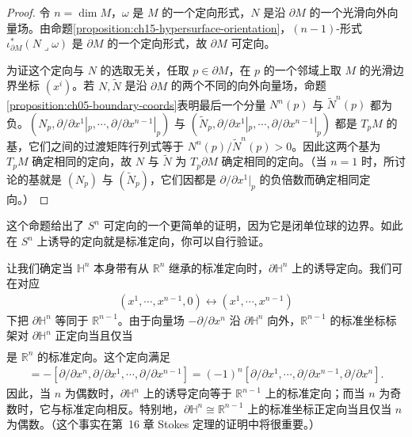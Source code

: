 \documentclass[../../main.tex]{subfiles}
\begin{document}
\begin{proof}
令 $n=\dim M$，$\omega$ 是 $M$ 的一个定向形式，$N$ 是沿 $\partial M$ 的一个光滑向外向量场。由命题\ref{proposition:ch15-hypersurface-orientation}，$(n-1)$-形式 $\iota_{\partial M}^*(N\lrcorner\omega)$ 是 $\partial M$ 的一个定向形式，故 $\partial M$ 可定向。

为证这个定向与 $N$ 的选取无关，任取 $p\in\partial M$，在 $p$ 的一个邻域上取 $M$ 的光滑边界坐标 $(x^i)$。若 $N,\widetilde N$ 是沿 $\partial M$ 的两个不同的向外向量场，命题\ref{proposition:ch05-boundary-coords}表明最后一个分量 $N^n(p)$ 与 $\widetilde N^n(p)$ 都为负。$(N_p,\partial/\partial x^1|_p,\cdots ,\partial/\partial x^{n-1}|_p)$ 与 $(\widetilde N_p,\partial/\partial x^1|_p,\cdots ,\partial/\partial x^{n-1}|_p)$ 都是 $T_pM$ 的基，它们之间的过渡矩阵行列式等于 $N^n(p)/\widetilde N^n(p)>0$。因此这两个基为 $T_pM$ 确定相同的定向，故 $N$ 与 $\widetilde N$ 为 $T_p\partial M$ 确定相同的定向。（当 $n=1$ 时，所讨论的基就是 $(N_p)$ 与 $(\widetilde N_p)$，它们因都是 $\partial/\partial x^1|_p$ 的负倍数而确定相同定向。）
\end{proof}

\begin{example}\label{example:ch15-sphere-boundary}
这个命题给出了 $S^n$ 可定向的一个更简单的证明，因为它是闭单位球的边界。如此在 $S^n$ 上诱导的定向就是标准定向，你可以自行验证。
\end{example}

\begin{example}\label{example:ch15-halfspace}
让我们确定当 $\mathbb{H}^n$ 本身带有从 $\mathbb{R}^n$ 继承的标准定向时，$\partial\mathbb{H}^n$ 上的诱导定向。我们可在对应
\begin{align*}
(x^1,\cdots ,x^{n-1},0)\leftrightarrow(x^1,\cdots ,x^{n-1})
\end{align*}
下把 $\partial\mathbb{H}^n$ 等同于 $\mathbb{R}^{n-1}$。由于向量场 $-\partial/\partial x^n$ 沿 $\partial\mathbb{H}^n$ 向外，$\mathbb{R}^{n-1}$ 的标准坐标标架对 $\partial\mathbb{H}^n$ 正定向当且仅当
\begin{align*}
[-\partial/\partial x^n,\partial/\partial x^1,\cdots ,\partial/\partial x^{n-1}]
\end{align*}
是 $\mathbb{R}^n$ 的标准定向。这个定向满足
\begin{align*}
[-\partial/\partial x^n,\partial/\partial x^1,\cdots ,\partial/\partial x^{n-1}]
=-[\partial/\partial x^n,\partial/\partial x^1,\cdots ,\partial/\partial x^{n-1}]
=(-1)^n[\partial/\partial x^1,\cdots ,\partial/\partial x^{n-1},\partial/\partial x^n].
\end{align*}
因此，当 $n$ 为偶数时，$\partial\mathbb{H}^n$ 上的诱导定向等于 $\mathbb{R}^{n-1}$ 上的标准定向；而当 $n$ 为奇数时，它与标准定向相反。特别地，$\partial\mathbb{H}^n\cong\mathbb{R}^{n-1}$ 上的标准坐标正定向当且仅当 $n$ 为偶数。（这个事实在第~16 章 Stokes 定理的证明中将很重要。）
\end{example}
\end{document}
